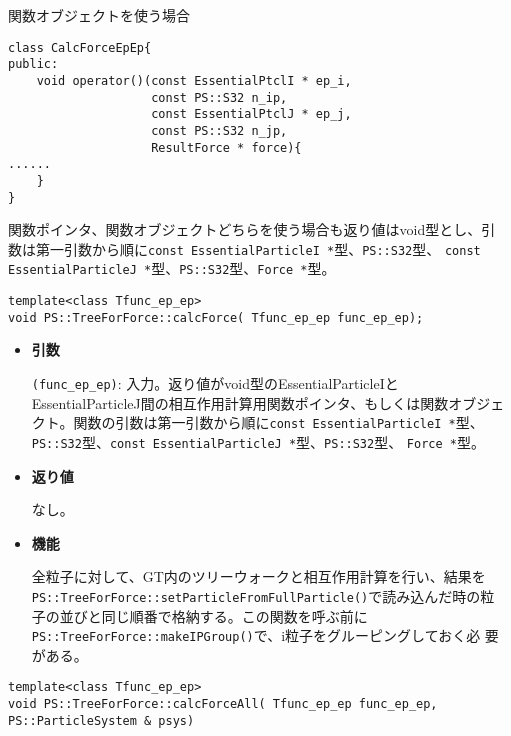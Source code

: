 関数オブジェクトを使う場合
\begin{lstlisting}[caption=関数ポインタを使う場合]
class CalcForceEpEp{
public:
    void operator()(const EssentialPtclI * ep_i,
                    const PS::S32 n_ip,
                    const EssentialPtclJ * ep_j,
                    const PS::S32 n_jp,
                    ResultForce * force){
......
    }
}
\end{lstlisting}

関数ポインタ、関数オブジェクトどちらを使う場合も返り値はvoid型とし、引
数は第一引数から順に{\tt const EssentialParticleI *}型、{\tt PS::S32}型、
{\tt const EssentialParticleJ *}型、{\tt PS::S32}型、{\tt Force *}型。


\begin{screen}
\begin{verbatim}
template<class Tfunc_ep_ep>
void PS::TreeForForce::calcForce( Tfunc_ep_ep func_ep_ep);

\end{verbatim}
\end{screen}

\begin{itemize}

\item{{\bf 引数}}

{\tt (func\_ep\_ep)}: 入力。返り値がvoid型の{EssentialParticleI}と
{EssentialParticleJ}間の相互作用計算用関数ポインタ、もしくは関数オブジェ
クト。関数の引数は第一引数から順に{\tt const EssentialParticleI *}型、
{\tt PS::S32}型、{\tt const EssentialParticleJ *}型、{\tt PS::S32}型、
{\tt Force *}型。

\item{{\bf 返り値}}

なし。

\item{{\bf 機能}}

全粒子に対して、GT内のツリーウォークと相互作用計算を行い、結果を\\
{\tt PS::TreeForForce::setParticleFromFullParticle()}で読み込んだ時の粒
子の並びと同じ順番で格納する。この関数を呼ぶ前に
\verb|PS::TreeForForce::makeIPGroup()|で、i粒子をグルーピングしておく必
要がある。

\end{itemize}

\begin{screen}
\begin{verbatim}
template<class Tfunc_ep_ep>
void PS::TreeForForce::calcForceAll( Tfunc_ep_ep func_ep_ep,  PS::ParticleSystem & psys) 

\end{verbatim}
\end{screen}

